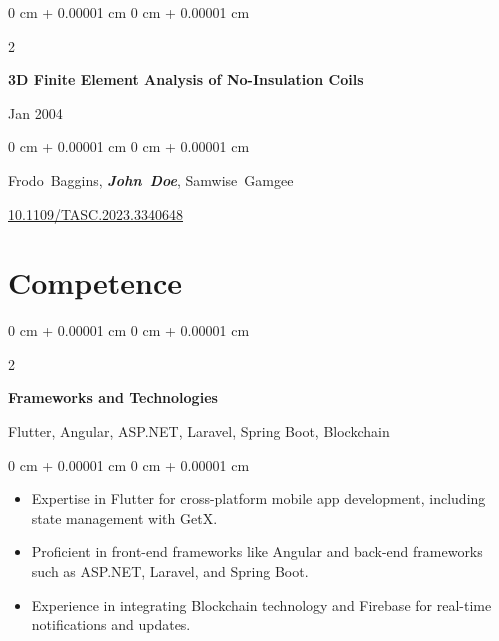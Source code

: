 \documentclass[10pt, letterpaper]{article}
\newenvironment{highlights}{
    \begin{itemize}[
        topsep=0.10 cm,
        parsep=0.10 cm,
        partopsep=0pt,
        itemsep=0pt,
        leftmargin=0 cm + 10pt
    ]
}{
    \end{itemize}
} %
\newenvironment{onecolentry}{
    \begin{adjustwidth}{
        0 cm + 0.00001 cm
    }{
        0 cm + 0.00001 cm
    }
}{
    \end{adjustwidth}
} %
\newenvironment{twocolentry}[2][]{
    \onecolentry
    \def\secondColumn{#2}
    \setcolumnwidth{\fill, 4.5 cm}
    \begin{paracol}{2}
}{
    \switchcolumn \raggedleft \secondColumn
    \end{paracol}
    \endonecolentry
} %
\begin{document}
        
        
                
                \begin{samepage}
                    \begin{twocolentry}{
                        Jan 2004
                    }
                        \textbf{3D Finite Element Analysis of No-Insulation Coils}
                    \end{twocolentry}
        
                    \vspace{0.10 cm}
                    
                    \begin{onecolentry}
                        \mbox{Frodo Baggins}, \mbox{\textbf{\textit{John Doe}}}, \mbox{Samwise Gamgee}
        
                        \vspace{0.10 cm}
                        
                \href{https://doi.org/10.1109/TASC.2023.3340648}{10.1109/TASC.2023.3340648}
                \end{onecolentry}
                \end{samepage}
        
        
            
        
        
        \section{Competence}
        
                \begin{twocolentry}{
                    Flutter, Angular, ASP.NET, Laravel, Spring Boot, Blockchain
                }
                    \textbf{Frameworks and Technologies}
                \end{twocolentry}
                
                \vspace{0.10 cm}
                \begin{onecolentry}
                    \begin{highlights}
                        \item Expertise in Flutter for cross-platform mobile app development, including state management with GetX.
                        \item Proficient in front-end frameworks like Angular and back-end frameworks such as ASP.NET, Laravel, and Spring Boot.
                        \item Experience in integrating Blockchain technology and Firebase for real-time notifications and updates.
                    \end{highlights}
                \end{onecolentry}
                
\end{document}
